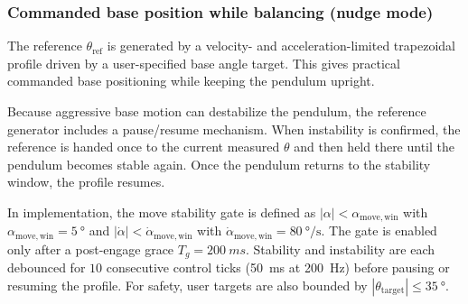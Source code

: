 \subsubsection*{Commanded base position while balancing (nudge mode)}
The reference $\theta_{\mathrm{ref}}$ is generated by a velocity- and acceleration-limited trapezoidal profile driven by a user-specified base angle target. This gives practical commanded base positioning while keeping the pendulum upright.

Because aggressive base motion can destabilize the pendulum, the reference generator includes a pause/resume mechanism. When instability is confirmed, the reference is handed once to the current measured $\theta$ and then held there until the pendulum becomes stable again. Once the pendulum returns to the stability window, the profile resumes.

In implementation, the move stability gate is defined as $|\alpha|<\alpha_{\mathrm{move,win}}$ with $\alpha_{\mathrm{move,win}}=\SI{5}{\degree}$ and $|\dot{\alpha}|<\dot{\alpha}_{\mathrm{move,win}}$ with $\dot{\alpha}_{\mathrm{move,win}}=\SI{80}{\degree\per\second}$. The gate is enabled only after a post-engage grace $T_g=\SI{200}{ms}$. Stability and instability are each debounced for $10$ consecutive control ticks (\SI{50}{ms} at \SI{200}{Hz}) before pausing or resuming the profile. For safety, user targets are also bounded by $|\theta_{\mathrm{target}}|\le \SI{35}{\degree}$.

